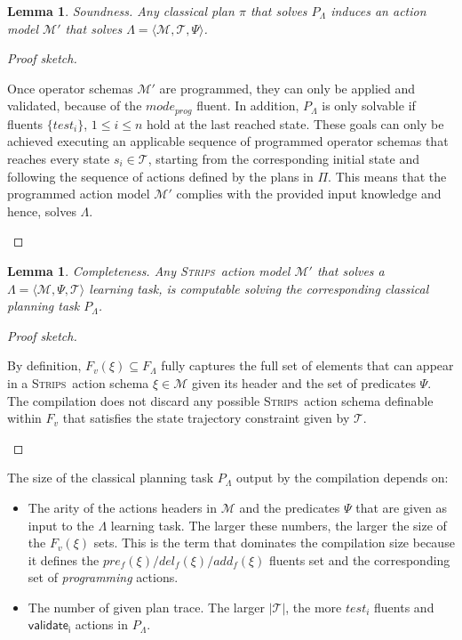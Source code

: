 \documentclass[letterpaper]{article} %
\newcommand{\tup}[1]{{\langle #1 \rangle}}
\newcommand{\strips}{\textsc{Strips}}     %
\newtheorem{lemma}[theorem]{Lemma}
\begin{document}
\begin{lemma}
Soundness. Any classical plan $\pi$ that solves $P_{\Lambda}$ induces an action model $\mathcal{M}'$ that solves $\Lambda=\tup{\mathcal{M},\mathcal{T},\Psi}$.
\end{lemma}

\begin{proof}[Proof sketch]
\begin{small}
Once operator schemas $\mathcal{M}'$ are programmed, they can only be applied and validated, because of the $mode_{prog}$ fluent. In addition, $P_{\Lambda}$ is only solvable if fluents $\{test_i\}$, {\small $1\leq i\leq n$} hold at the last reached state. These goals can only be achieved executing an applicable sequence of programmed operator schemas that reaches every state $s_i\in\mathcal{T}$, starting from the corresponding initial state and following the sequence of actions defined by the plans in $\Pi$. This means that the programmed action model $\mathcal{M}'$ complies with the provided input knowledge and hence, solves $\Lambda$.
\end{small}
\end{proof}


\begin{lemma}
Completeness. Any \strips\ action model $\mathcal{M}'$ that solves a $\Lambda=\tup{\mathcal{M},\Psi,\mathcal{T}}$ learning task, is computable solving the corresponding classical planning task $P_{\Lambda}$.
\end{lemma}

\begin{proof}[Proof sketch]
\begin{small}
By definition, $F_v(\xi)\subseteq F_\Lambda$ fully captures the full set of elements that can appear in a \strips\ action schema $\xi\in\mathcal{M}$ given its header and the set of predicates $\Psi$. The compilation does not discard any possible \strips\ action schema definable within $F_v$ that satisfies the state trajectory constraint given by $\mathcal{T}$.
\end{small}
\end{proof}

The size of the classical planning task $P_{\Lambda}$ output by the compilation depends on:
\begin{itemize}
\item The arity of the actions headers in $\mathcal{M}$ and the predicates $\Psi$ that are given as input to the $\Lambda$ learning task. The larger these numbers, the larger the size of the $F_v(\xi)$ sets. This is the term that dominates the compilation size because it defines the $pre_f(\xi)/del_f(\xi)/add_f(\xi)$ fluents set and the corresponding set of {\em programming} actions.
\item The number of given plan trace. The larger $|\mathcal{T}|$, the more $test_i$ fluents and $\mathsf{validate_{i}}$ actions in $P_{\Lambda}$.
\end{itemize}
\end{document}
